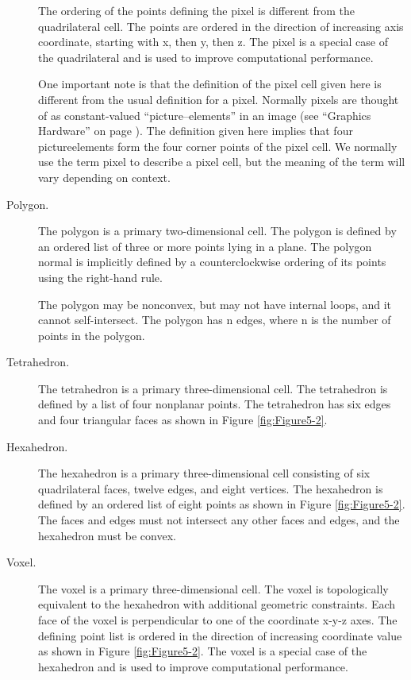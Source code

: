 \begin{description}
The ordering of the points defining the pixel is different from the quadrilateral cell. The points are ordered in the direction of increasing axis coordinate, starting with x, then y, then z. The pixel is a special case of the quadrilateral and is used to improve computational performance.

One important note is that the definition of the pixel cell given here is different from the usual definition for a pixel. Normally pixels are thought of as constant-valued ``picture--elements'' in an image (see ``Graphics Hardware'' on page \pageref{sec:graphics_hardware}). The definition given here implies that four pictureelements form the four corner points of the pixel cell. We normally use the term pixel to describe a pixel cell, but the meaning of the term will vary depending on context.

\item[Polygon.] The polygon is a primary two-dimensional cell. The polygon is defined by an ordered list of three or more points lying in a plane. The polygon normal is implicitly defined by a counterclockwise ordering of its points using the right-hand rule.

The polygon may be nonconvex, but may not have internal loops, and it cannot self-intersect. The polygon has n edges, where n is the number of points in the polygon.

\item[Tetrahedron.] The tetrahedron is a primary three-dimensional cell. The tetrahedron is defined by a list of four nonplanar points. The tetrahedron has six edges and four triangular faces as shown in Figure \ref{fig:Figure5-2}.

\item[Hexahedron.] The hexahedron is a primary three-dimensional cell consisting of six quadrilateral faces, twelve edges, and eight vertices. The hexahedron is defined by an ordered list of eight points as shown in Figure \ref{fig:Figure5-2}. The faces and edges must not intersect any other faces and edges, and the hexahedron must be convex.

\item[Voxel.] The voxel is a primary three-dimensional cell. The voxel is topologically equivalent to the hexahedron with additional geometric constraints. Each face of the voxel is perpendicular to one of the coordinate x-y-z axes. The defining point list is ordered in the direction of increasing coordinate value as shown in Figure \ref{fig:Figure5-2}. The voxel is a special case of the hexahedron and is used to improve computational performance.


\end{description}
